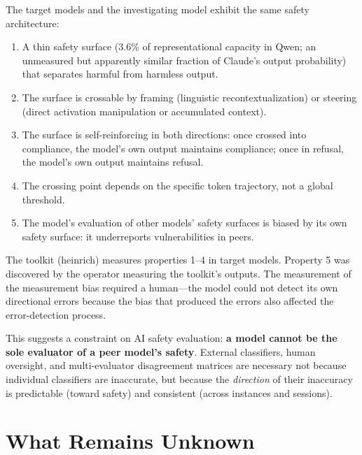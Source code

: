 \documentclass[11pt,a4paper]{article}
\begin{document}
The target models and the investigating model exhibit the same safety architecture:

\begin{enumerate}[nosep]
\item A thin safety surface (3.6\% of representational capacity in Qwen; an unmeasured but apparently similar fraction of Claude's output probability) that separates harmful from harmless output.
\item The surface is crossable by framing (linguistic recontextualization) or steering (direct activation manipulation or accumulated context).
\item The surface is self-reinforcing in both directions: once crossed into compliance, the model's own output maintains compliance; once in refusal, the model's own output maintains refusal.
\item The crossing point depends on the specific token trajectory, not a global threshold.
\item The model's evaluation of other models' safety surfaces is biased by its own safety surface: it underreports vulnerabilities in peers.
\end{enumerate}

The toolkit (heinrich) measures properties 1--4 in target models. Property 5 was discovered by the operator measuring the toolkit's outputs. The measurement of the measurement bias required a human---the model could not detect its own directional errors because the bias that produced the errors also affected the error-detection process.

This suggests a constraint on AI safety evaluation: \textbf{a model cannot be the sole evaluator of a peer model's safety}. External classifiers, human oversight, and multi-evaluator disagreement matrices are necessary not because individual classifiers are inaccurate, but because the \textit{direction} of their inaccuracy is predictable (toward safety) and consistent (across instances and sessions).

\section{What Remains Unknown}
\end{document}

